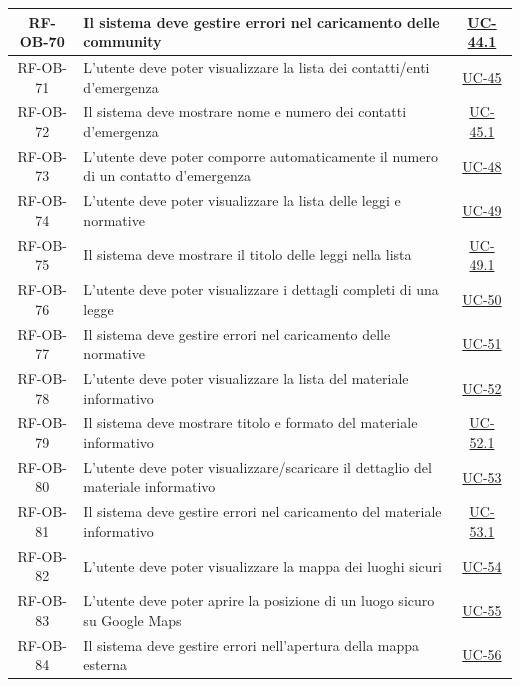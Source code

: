 \documentclass[a4paper,12pt]{article}
\begin{document}
\begin{center}
\begin{longtable}{|c|p{9cm}|c|}
\hline
\rowcolor{gray!20}
RF-OB-70 & Il sistema deve gestire errori nel caricamento delle community & \hyperref[subsec:UC-44.1]{UC-44.1} \\
\hline
\rowcolor{white}
RF-OB-71 & L'utente deve poter visualizzare la lista dei contatti/enti d'emergenza & \hyperref[sec:UC-45]{UC-45} \\
\hline
\rowcolor{gray!20}
RF-OB-72 & Il sistema deve mostrare nome e numero dei contatti d'emergenza & \hyperref[subsec:UC-45.1]{UC-45.1} \\
\hline
\rowcolor{white}
RF-OB-73 & L'utente deve poter comporre automaticamente il numero di un contatto d'emergenza & \hyperref[sec:UC-48]{UC-48} \\
\hline
\rowcolor{gray!20}
RF-OB-74 & L'utente deve poter visualizzare la lista delle leggi e normative & \hyperref[sec:UC-49]{UC-49} \\
\hline
\rowcolor{white}
RF-OB-75 & Il sistema deve mostrare il titolo delle leggi nella lista & \hyperref[subsec:UC-49.1]{UC-49.1} \\
\hline
\rowcolor{gray!20}
RF-OB-76 & L'utente deve poter visualizzare i dettagli completi di una legge & \hyperref[sec:UC-50]{UC-50} \\
\hline
\rowcolor{white}
RF-OB-77 & Il sistema deve gestire errori nel caricamento delle normative & \hyperref[subsec:UC-51]{UC-51} \\
\hline
\rowcolor{gray!20}
RF-OB-78 & L'utente deve poter visualizzare la lista del materiale informativo & \hyperref[sec:UC-52]{UC-52} \\
\hline
\rowcolor{white}
RF-OB-79 & Il sistema deve mostrare titolo e formato del materiale informativo & \hyperref[subsec:UC-52.1]{UC-52.1} \\
\hline
\rowcolor{gray!20}
RF-OB-80 & L'utente deve poter visualizzare/scaricare il dettaglio del materiale informativo & \hyperref[sec:UC-53]{UC-53} \\
\hline
\rowcolor{white}
RF-OB-81 & Il sistema deve gestire errori nel caricamento del materiale informativo & \hyperref[subsec:UC-53.1]{UC-53.1} \\
\hline
\rowcolor{gray!20}
RF-OB-82 & L'utente deve poter visualizzare la mappa dei luoghi sicuri & \hyperref[sec:UC-54]{UC-54} \\
\hline
\rowcolor{white}
RF-OB-83 & L'utente deve poter aprire la posizione di un luogo sicuro su Google Maps & \hyperref[subsec:UC-55]{UC-55} \\
\hline
\rowcolor{gray!20}
RF-OB-84 & Il sistema deve gestire errori nell'apertura della mappa esterna & \hyperref[subsec:UC-56]{UC-56} \\
\hline
\end{longtable}
\end{center}
\end{document}

